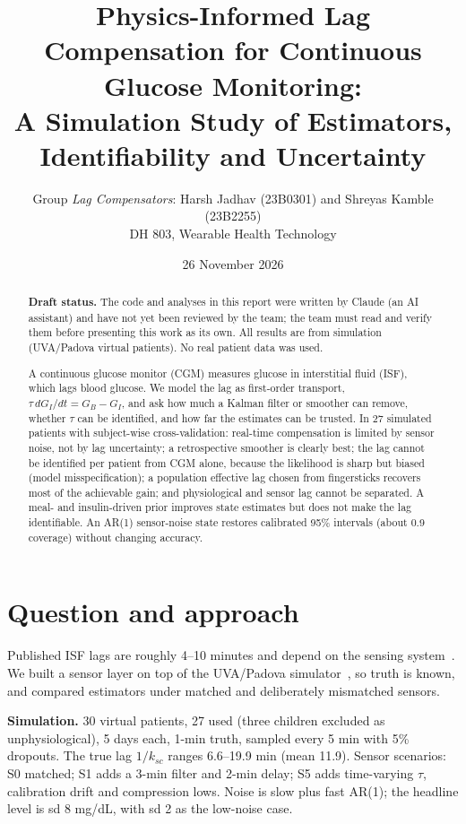\documentclass[11pt,a4paper]{article}
\title{Physics-Informed Lag Compensation for Continuous Glucose Monitoring:\\ A Simulation Study of Estimators, Identifiability and Uncertainty}
\author{Group \emph{Lag Compensators}: Harsh Jadhav (23B0301) and Shreyas Kamble (23B2255)\\ DH 803, Wearable Health Technology}
\date{26 November 2026}
\begin{document}
\maketitle
\begin{abstract}
\noindent\textbf{Draft status.} The code and analyses in this report were written by Claude (an AI assistant) and have not yet been reviewed by the team; the team must read and verify them before presenting this work as its own. All results are from simulation (UVA/Padova virtual patients). No real patient data was used.

A continuous glucose monitor (CGM) measures glucose in interstitial fluid (ISF), which lags blood glucose. We model the lag as first-order transport, $\tau\,dG_I/dt=G_B-G_I$, and ask how much a Kalman filter or smoother can remove, whether $\tau$ can be identified, and how far the estimates can be trusted. In 27 simulated patients with subject-wise cross-validation: real-time compensation is limited by sensor noise, not by lag uncertainty; a retrospective smoother is clearly best; the lag cannot be identified per patient from CGM alone, because the likelihood is sharp but biased (model misspecification); a population effective lag chosen from fingersticks recovers most of the achievable gain; and physiological and sensor lag cannot be separated. A meal- and insulin-driven prior improves state estimates but does not make the lag identifiable. An AR(1) sensor-noise state restores calibrated 95\% intervals (about 0.9 coverage) without changing accuracy.
\end{abstract}

\section{Question and approach}
Published ISF lags are roughly 4--10 minutes and depend on the sensing system~\cite{basu2013,schmelzeisen2015}. We built a sensor layer on top of the UVA/Padova simulator~\cite{dallaman2014}, so truth is known, and compared estimators under matched and deliberately mismatched sensors.

\textbf{Simulation.} 30 virtual patients, 27 used (three children excluded as unphysiological), 5 days each, 1-min truth, sampled every 5 min with 5\% dropouts. The true lag $1/k_{sc}$ ranges 6.6--19.9 min (mean 11.9). Sensor scenarios: S0 matched; S1 adds a 3-min filter and 2-min delay; S5 adds time-varying $\tau$, calibration drift and compression lows. Noise is slow plus fast AR(1); the headline level is sd 8 mg/dL, with sd 2 as the low-noise case.
\end{document}
